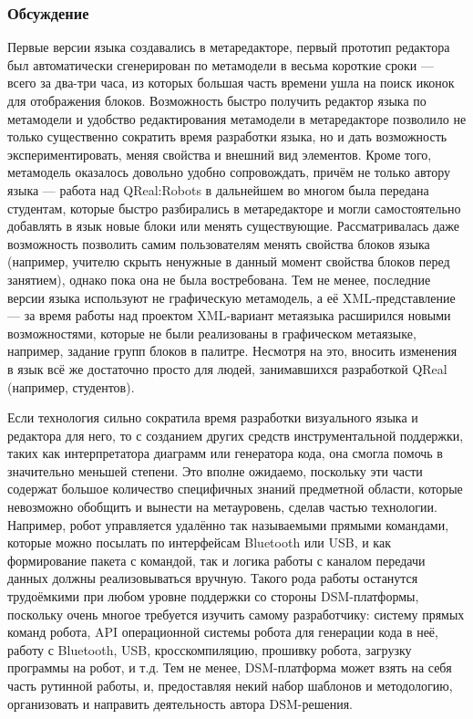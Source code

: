 \subsubsection{Обсуждение}
Первые версии языка создавались в метаредакторе, первый прототип редактора был автоматически 
сгенерирован по метамодели в весьма короткие сроки --- всего за два-три часа, из которых 
большая часть времени ушла на поиск иконок для отображения блоков. Возможность быстро 
получить редактор языка по метамодели и удобство редактирования метамодели в метаредакторе 
позволило не только существенно сократить время разработки языка, но и дать возможность 
экспериментировать, меняя свойства и внешний вид элементов. Кроме того, метамодель 
оказалось довольно удобно сопровождать, причём не только автору языка --- работа над 
QReal:Robots в дальнейшем во многом была передана студентам, которые быстро разбирались 
в метаредакторе и могли самостоятельно добавлять в язык новые блоки или менять существующие. 
Рассматривалась даже возможность позволить самим пользователям менять свойства блоков 
языка (например, учителю скрыть ненужные в данный момент свойства блоков перед занятием), 
однако пока она не была востребована. Тем не менее, последние версии языка используют 
не графическую метамодель, а её XML-представление --- за время работы над проектом 
XML-вариант метаязыка расширился новыми возможностями, которые не были реализованы 
в графическом метаязыке, например, задание групп блоков в палитре. Несмотря на это, 
вносить изменения в язык всё же достаточно просто для людей, занимавшихся разработкой 
QReal (например, студентов).

Если технология сильно сократила время разработки визуального языка и редактора для 
него, то с созданием других средств инструментальной поддержки, таких как интерпретатора 
диаграмм или генератора кода, она смогла помочь в значительно меньшей степени. Это 
вполне ожидаемо, поскольку эти части содержат большое количество специфичных знаний 
предметной области, которые невозможно обобщить и вынести на метауровень, сделав частью 
технологии. Например, робот управляется удалённо так называемыми прямыми командами, 
которые можно посылать по интерфейсам Bluetooth или USB, и как формирование пакета 
с командой, так и логика работы с каналом передачи данных должны реализовываться вручную. 
Такого рода работы останутся трудоёмкими при любом уровне поддержки со стороны DSM-платформы, 
поскольку очень многое требуется изучить самому разработчику: систему прямых команд 
робота, API операционной системы робота для генерации кода в неё, работу с Bluetooth, 
USB, кросскомпиляцию, прошивку робота, загрузку программы на робот, и т.д. Тем не менее, 
DSM-платформа может взять на себя часть рутинной работы, и, предоставляя некий набор 
шаблонов и методологию, организовать и направить деятельность автора DSM-решения.

